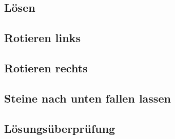 \subsection{Lösen}
		
\subsection{Rotieren links}
		
\clearpage
\subsection{Rotieren rechts}
		
\subsection{Steine nach unten fallen lassen}
		
\clearpage
\subsection{Lösungsüberprüfung}
		

